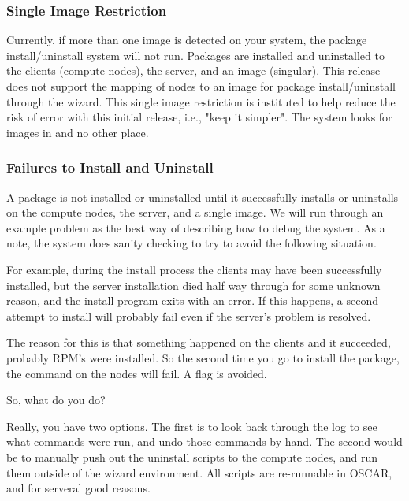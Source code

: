 
\subsubsection{Single Image Restriction}
\label{det:single-image-restriction}

Currently, if more than one image is detected on your system, the package
install/uninstall system will not run.  Packages are installed and
uninstalled to the clients (compute nodes), the server, and an image
(singular).  This release does not support the mapping of nodes to an
image for package install/uninstall through the wizard.  This single
image restriction is instituted to help reduce the risk of error with this
initial release, i.e., "keep it simpler".  The system looks for images in
 and no other place.


\subsubsection{Failures to Install and Uninstall}
\label{det:failures-install-uninstall}

A package is not installed or uninstalled until it successfully installs or
uninstalls on the compute nodes, the server, and a single image.  We will
run through an example problem as the best way of describing how to debug 
the system.  As a note, the system does sanity checking to try to avoid the
following situation.

For example, during the install process the clients may have been successfully
installed, but the server installation died half way through for some unknown
reason, and the install program exits with an error.  If this happens, a
second attempt to install will probably fail even if the server's problem
is resolved.

The reason for this is that something happened on the clients and it
succeeded, probably RPM's were installed.  So the second time you go to
install the package, the  command on the nodes will fail.
A  flag is avoided.

So, what do you do?

Really, you have two options.  The first is to look back through the log to
see what commands were run, and undo those commands by hand.  The second
would be to manually push out the uninstall scripts to the compute nodes,
and run them outside of the wizard environment.  All scripts are re-runnable
in OSCAR, and for serveral good reasons.

